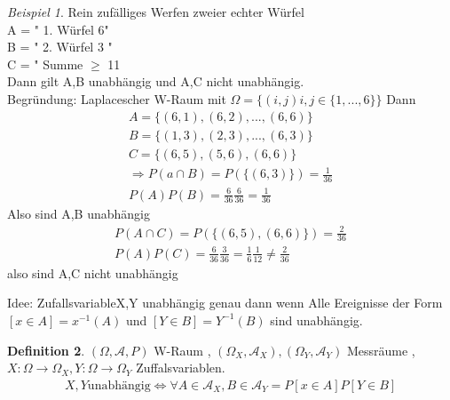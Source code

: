 \documentclass[a4paper,12pt,fleqn]{scrartcl}
\newcommand{\m}[1]{\mathcal{ #1 }}
\newcommand{\ZV}{Zufallsvariable}
\theoremstyle{definition}
\newtheorem{definition}{Definition}[section]
\theoremstyle{plain}
\theoremstyle{remark}
\newtheorem{beispiel}[definition]{Beispiel}
\begin{document}
\begin{beispiel}
Rein zufälliges Werfen zweier echter Würfel \\
A = " 1. Würfel 6" \\
B = " 2. Würfel 3 " \\
C = " Summe $\geq$ 11 \\
Dann gilt A,B unabhängig und A,C nicht unabhängig. \\

Begründung: Laplacescher W-Raum mit $ \Omega = \{ (i,j) i,j \in \{ 1,...,6 \} \}$ Dann 
\begin{align*}
A = \{ (6,1),(6,2),...,(6,6) \} \\
B = \{ (1,3),(2,3),...,(6,3) \} \\
C = \{ (6,5),(5,6),(6,6) \} \\
\Rightarrow P(a \cap B) = P( \{ (6,3) \} ) = \frac{1}{36} \\
P(A)P(B) = \frac{6}{36} \frac{6}{36} = \frac{1}{36}
\end{align*}
Also sind A,B unabhängig 
\begin{align*}
P(A \cap C ) = P(\{ (6,5),(6,6) \} ) = \frac{2}{36} \\
P(A)P(C) = \frac{6}{36} \frac{3}{36} = \frac{1}{6} \frac{1}{12} \neq \frac{2}{36} 
\end{align*}
also sind A,C nicht unabhängig \\
\end{beispiel}
Idee: \ZV  X,Y unabhängig genau dann wenn Alle Ereignisse der Form  $[x \in A] = x^{-1}(A) $ und $ [Y \in B] = Y^{-1}(B)$ sind unabhängig.

\begin{definition}
$( \Omega , \m{A} , P) $ W-Raum , $ ( \Omega_X , \m{A}_X ) , (\Omega_Y , \m{A}_Y ) $ Messräume , $X: \Omega \rightarrow \Omega_X , Y: \Omega \rightarrow \Omega_Y$ Zuffalsvariablen. 
\begin{align*}
X,Y \text{unabhängig} \Leftrightarrow \forall A \in \m{A}_X , B \in \m{A}_Y = P[x \in A]P[Y \in B]
\end{align*}
\end{definition}
\end{document}
